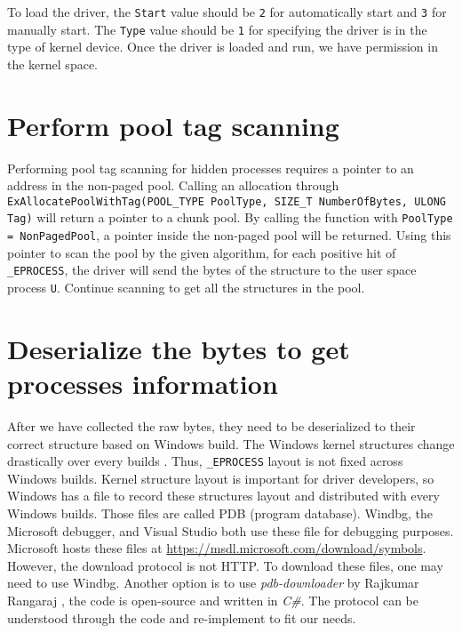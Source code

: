 To load the driver, the \texttt{Start} value should be \texttt{2} for automatically start and \texttt{3} for manually start. The \texttt{Type} value should be \texttt{1} for specifying the driver is in the type of kernel device. Once the driver is loaded and run, we have permission in the kernel space.

\section[Perform pool tag scanning]{Perform pool tag scanning}

Performing pool tag scanning for hidden processes requires a pointer to an address in the non-paged pool. Calling an allocation through \texttt{ExAllocatePoolWithTag(POOL\_TYPE PoolType, SIZE\_T NumberOfBytes, ULONG Tag)} will return a pointer to a chunk pool. By calling the function with \texttt{PoolType = NonPagedPool}, a pointer inside the non-paged pool will be returned. Using this pointer to scan the pool by the given algorithm, for each positive hit of \texttt{\_EPROCESS}, the driver will send the bytes of the structure to the user space process \texttt{U}. Continue scanning to get all the structures in the pool.

\section[Deserialize the bytes to get processes information]{Deserialize the bytes to get processes information}

After we have collected the raw bytes, they need to be deserialized to their correct structure based on Windows build. The Windows kernel structures change drastically over every builds \cite{windowsKernelCharacterization}. Thus, \texttt{\_EPROCESS} layout is not fixed across Windows builds. Kernel structure layout is important for driver developers, so Windows has a file to record these structures layout and distributed with every Windows builds. Those files are called PDB (program database). Windbg, the Microsoft debugger, and Visual Studio both use these file for debugging purposes. Microsoft hosts these files at \url{https://msdl.microsoft.com/download/symbols}. However, the download protocol is not HTTP. To download these files, one may need to use Windbg. Another option is to use \textit{pdb-downloader} by Rajkumar Rangaraj \cite{pdb-downloader}, the code is open-source and written in \textit{C\#}. The protocol can be understood through the code and re-implement to fit our needs.

